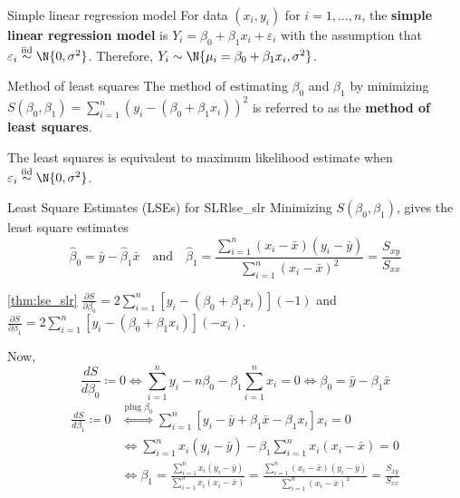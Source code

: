 \begin{Definition}{Simple linear regression model}{}
    For data $ (x_i,y_i) $ for $ i=1,\ldots,n $, the
    \textbf{simple linear regression model} is
    $ Y_i=\beta_0+\beta_1x_i+\varepsilon_i $
    with the assumption that
    $ \varepsilon_i\stackrel{\text{iid}}{\sim}\N{0,\sigma^2} $.
    Therefore,
    $ Y_i\sim \N{\mu_i=\beta_0+\beta_1x_i,\sigma^2} $.
\end{Definition}
\begin{Definition}{Method of least squares}{}
    The method of estimating $ \beta_0 $
    and $ \beta_1 $ by minimizing
    $ S(\beta_0,\beta_1)=\sum_{i=1}^{n}(y_i-(\beta_0+\beta_1x_i))^2 $
    is referred to as the \textbf{method of least squares}.
\end{Definition}
\begin{Remark}{}{}
    The least squares is equivalent to maximum likelihood estimate
    when $ \varepsilon_i\stackrel{\text{iid}}{\sim}\N{0,\sigma^2} $.
\end{Remark}
\begin{Theorem}{Least Square Estimates (LSEs) for SLR}{lse_slr}
    Minimizing $ S(\beta_0,\beta_1) $, gives the
    least square estimates
    \[ \hat{\beta}_0=\bar{y}-\hat{\beta}_1\bar{x}\quad\text{and}
        \quad
        \hat{\beta}_1=
        \frac{\sum_{i=1}^{n} (x_i-\bar{x})(y_i-\bar{y})}{
            \sum_{i=1}^{n} (x_i-\bar{x})^2
        }=\frac{S_{xy}}{S_{xx}}   \]
\end{Theorem}
\begin{Proof}{\ref{thm:lse_slr}}{}
    $ \displaystyle \frac{\partial S}{\partial\beta_0}=2
        \sum\limits_{i=1}^{n} \left[ y_i-(\beta_0+\beta_1x_i) \right](-1)
    $ and $ \displaystyle
        \frac{\partial S}{\partial\beta_1}=2
        \sum\limits_{i=1}^{n} \left[ y_i-(\beta_0+\beta_1x_i) \right](-x_i) $.

    Now,
    \[ \frac{dS}{d\beta_0}\coloneq 0
        \iff \sum\limits_{i=1}^{n}y_i-n\beta_0-
        \beta_1 \sum\limits_{i=1}^{n} x_i=0
        \iff \beta_0=\bar{y}-\beta_1\bar{x} \]
    \begin{align*}
        \frac{dS}{d\beta_1}\coloneq 0
         & \stackrel{\text{plug }\beta_0}{\iff}
        \sum\limits_{i=1}^{n} \left[ y_i-\bar{y}+\beta_1\bar{x}-\beta_1 x_i \right]x_i=0 \\
         & \iff \sum\limits_{i=1}^{n} x_i(y_i-\bar{y})-\beta_1
        \sum\limits_{i=1}^{n} x_i(x_i-\bar{x})=0                                         \\
         & \iff \beta_1=\frac{\sum_{i=1}^{n} x_i(y_i-\bar{y})}{\sum_{i=1}^{n}
            x_i
            (x_i-\bar{x})}=\frac{\sum_{i=1}^{n}(x_i-\bar{x})
            (y_i-\bar{y})}{
            \sum_{i=1}^{n} (x_i-\bar{x})^2
        }=\frac{S_{xy}}{S_{xx}}
    \end{align*}
\end{Proof}
